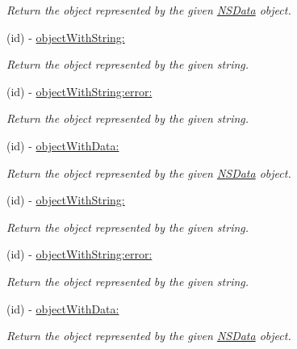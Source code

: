 \begin{DoxyCompactItemize}
\begin{DoxyCompactList}\small\item\em \-Return the object represented by the given \hyperlink{class_n_s_data}{\-N\-S\-Data} object. \end{DoxyCompactList}\item 
(id) -\/ \hyperlink{interface_s_b_json_parser_a1ec40b986576044d58d30172b141c74c}{object\-With\-String\-:}
\begin{DoxyCompactList}\small\item\em \-Return the object represented by the given string. \end{DoxyCompactList}\item 
(id) -\/ \hyperlink{interface_s_b_json_parser_a7a7fff47f41a08fa0defc4f628846e15}{object\-With\-String\-:error\-:}
\begin{DoxyCompactList}\small\item\em \-Return the object represented by the given string. \end{DoxyCompactList}\item 
(id) -\/ \hyperlink{interface_s_b_json_parser_a66d7be591cdf0d9ee85c21c863ef5cbf}{object\-With\-Data\-:}
\begin{DoxyCompactList}\small\item\em \-Return the object represented by the given \hyperlink{class_n_s_data}{\-N\-S\-Data} object. \end{DoxyCompactList}\item 
(id) -\/ \hyperlink{interface_s_b_json_parser_a1ec40b986576044d58d30172b141c74c}{object\-With\-String\-:}
\begin{DoxyCompactList}\small\item\em \-Return the object represented by the given string. \end{DoxyCompactList}\item 
(id) -\/ \hyperlink{interface_s_b_json_parser_a7a7fff47f41a08fa0defc4f628846e15}{object\-With\-String\-:error\-:}
\begin{DoxyCompactList}\small\item\em \-Return the object represented by the given string. \end{DoxyCompactList}\item 
(id) -\/ \hyperlink{interface_s_b_json_parser_a66d7be591cdf0d9ee85c21c863ef5cbf}{object\-With\-Data\-:}
\begin{DoxyCompactList}\small\item\em \-Return the object represented by the given \hyperlink{class_n_s_data}{\-N\-S\-Data} object. \end{DoxyCompactList}\item 

\end{DoxyCompactItemize}
